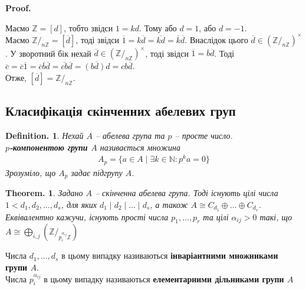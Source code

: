 \documentclass[a4paper, 10pt]{article}
\makeatletter
\theoremstyle{theoremdd}
\theoremstyle{theoremdd}
\theoremstyle{theoremdd}
\newtheorem*{definition*}{Definition.}
\theoremstyle{theoremdd}
\theoremstyle{theoremdd}
\theoremstyle{theoremdd}
\theoremstyle{theoremdd}
\theoremstyle{theoremdd}
\newtheorem*{theorem*}{Theorem.}
\theoremstyle{theoremdd}
\theoremstyle{theoremdd}
\theoremstyle{theoremdd}
\theoremstyle{theoremdd}
\theoremstyle{theoremdd}
\theoremstyle{theoremdd}
\theoremstyle{theoremdd}
\renewenvironment{proof}[1][Proof.\\]{\par
\pushQED{\hfill \qed}%
\normalfont \topsep6\p@\@plus6\p@\relax
\trivlist
\item\relax
{\bfseries
#1\@addpunct{.}}\hspace\labelsep\ignorespaces
}{%
\popQED\endtrivlist\@endpefalse
}
\makeatother
\begin{document}
\begin{proof}
Маємо $\mathbb{Z} = [d]$, тобто звідси $1 = kd$. Тому або $d = 1$, або $d = -1$.\\
Маємо $\mathbb{Z}/_{n \mathbb{Z}} = [\overline{d}]$, тоді звідси $\overline{1} = k \overline{d} = \overline{kd} = \overline{k} \overline{d}$. Внаслідок цього $\overline{d} \in (\mathbb{Z}/_{n \mathbb{Z}})^\times$. У зворотний бік нехай $\overline{d} \in (\mathbb{Z}/_{n \mathbb{Z}})^\times$, тоді звідси $\overline{1} = \overline{b} \overline{d}$. Тоді\\
$\overline{c} = \overline{c} \overline{1} = \overline{c} \overline{b} \overline{d} = \overline{cb} \overline{d} = \overline{(bd) d} = cb \overline{d}$.\\
Отже, $[\overline{d}] = \mathbb{Z}/_{n \mathbb{Z}}$.
\end{proof}

\subsection*{Класифікація скінченних абелевих груп}
\begin{definition*}
Нехай $A$ -- абелева група та $p$ -- просте число.\\
\textbf{$p$-компонентою групи $A$} називається множина
\begin{align*}
A_p = \{a \in A \mid \exists k \in \mathbb{N}: p^k a = 0 \}
\end{align*}
Зрозуміло, що $A_p$ задає підгрупу $A$.
\end{definition*}

\begin{theorem*}
Задано $A$ -- скінченна абелева група. Тоді існують цілі числа $1 < d_1,d_2,\dots,d_s$, для яких $d_1 \mid d_2 \mid \dots \mid d_s$, а також $A \cong C_{d_1} \oplus \dots \oplus C_{d_s}$.\\
Еквівалентно кажучи, існують прості числа $p_1,\dots,p_r$ та цілі $\alpha_{ij} > 0$ такі, що $\displaystyle A \cong \bigoplus_{i,j} \left(\mathbb{Z}/_{p_i^{\alpha_{ij}} \mathbb{Z}}\right)$
\end{theorem*}

Числа $d_1,\dots,d_s$ в цьому випадку називаються \textbf{інваріантними множниками групи $A$}.\\
Числа $p_i^{\alpha_{ij}}$ в цьому випадку називаються \textbf{елементарними дільниками групи $A$}
\end{document}
